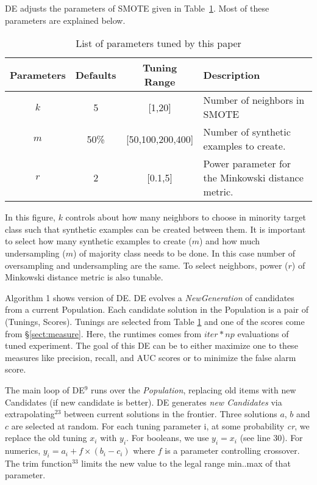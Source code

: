 \documentclass[sigconf]{acmart}
\theoremstyle{break}
\newcommand{\tion}[1]{{\S}\ref{sect:#1}}
\begin{document}
DE  adjusts the parameters of SMOTE given in
Table~\ref{tb:tuned}. Most of these parameters are explained below. 

\begin{table}[!htbp]
    \begin{center}
\scriptsize
\begin{tabular}{|c|c|c|p{3.5cm}|}
        \hline 
        \textbf{Parameters} & \textbf{Defaults} & \textbf{Tuning Range} & \textbf{Description}\\
        \hline
        $k$ & 5 & [1,20] & Number of neighbors in SMOTE \\ 
        \hline
       $m$ & 50\% & [50,100,200,400] & Number of synthetic examples to create. \\ 
        \hline
        $r$ & 2 & [0.1,5] & Power parameter for the Minkowski distance metric.\\

        \hline
\end{tabular}
\end{center}
\caption{List of parameters tuned by this paper}
\label{tb:tuned}
\end{table}
 
In this figure, $k$ controls about how many neighbors to choose in minority target class such that synthetic examples can be created between them. It is important to select how many synthetic examples to create ($m$) and how much undersampling ($m$) of majority class needs to be done. In this case number of oversampling and undersampling are the same. To select neighbors, power ($r$) of Minkowski distance metric is also tunable.

Algorithm 1 shows version of DE.  DE evolves a \textit{NewGeneration} of
candidates from a current Population.   Each candidate solution in the Population is a pair of
(Tunings, Scores). Tunings are selected from Table \ref{tb:tuned} and one of the scores
come from \tion{measure}. Here, the runtimes comes from $\mathit{iter} * np $ evaluations of tuned experiment. The goal of this DE can be to either maximize one to these measures like precision, recall, and AUC scores or to minimize the false alarm score.

The main loop of DE$^{9}$ runs over the \textit{Population}, replacing old items with new Candidates (if new candidate is better).
DE generates \textit{new Candidates} via 
extrapolating$^{23}$ between current solutions in the frontier. Three solutions $a$, $b$ and $c$ are
selected at random. For each tuning parameter i, at some probability \textit{cr}, we
replace the old tuning $x_i$ with $y_i$. For booleans, we use $y_i = x_i$ (see
line 30). For numerics, $y_i = a_i + f \times (b_i - c_i)$ where $f$ is a
parameter controlling crossover. The trim function$^{33}$ limits the new value
to the legal range min..max of that parameter.
\end{document}
